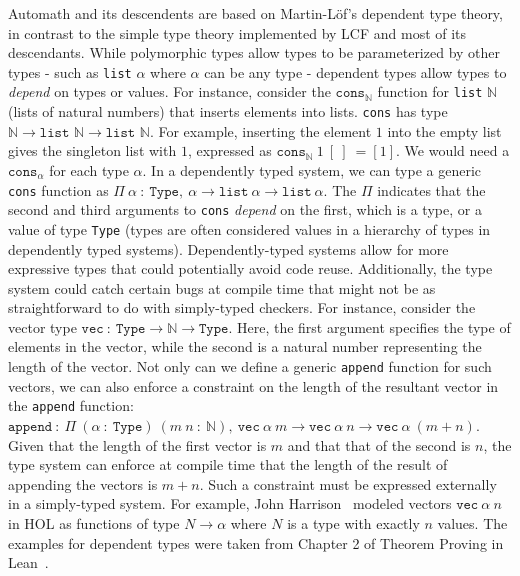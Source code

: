 \documentclass{article}
\begin{document}
  	Automath and its descendents are 
  	based on Martin-L\"{o}f's dependent 
  	type theory, in contrast to the
  	simple type theory implemented by  
  	LCF and most of	its descendants. 
  	While polymorphic 
  	types allow types to be 
  	parameterized by other types 
  	 - such as \texttt{list}
  	$ \alpha$ where $\alpha$ can be 
  	any type - dependent types allow 
  	types to \textit{depend} on 
  	types or values. For instance, 
  	consider the 
  	$\texttt{cons}_{\mathbb{N}}$
  	function for \texttt{list} 
  	$\mathbb{N}$ (lists of natural 
  	numbers) that inserts elements into 
  	lists. \texttt{cons} has type 
  	$\mathbb{N}	\to \texttt{list } 
  	\mathbb{N} \to \texttt{list } 
  	\mathbb{N}$. For example, 
  	inserting the element $1$ into 
  	the empty list gives the 
  	singleton list with $1$, expressed
  	as $\texttt{cons}_{\mathbb{N}}\ 
  	1\ [\ ]\ = [1]$. We would need 
  	a $\texttt{cons}_{\alpha}$ for 
  	each type $\alpha$. In a 
  	dependently typed system, we can 
  	type a generic \texttt{cons} 
  	function as $\Pi\ \alpha\ :\ 
  	\texttt{Type},\ \alpha \to 
  	\texttt{list}\ \alpha \to 
  	\texttt{list}\ \alpha$. The 
  	$\Pi$ indicates that the 
  	second and third arguments 
  	to \texttt{cons} \textit{depend}
  	on the first, which is a type, 
  	or a value of type \texttt{Type} 
  	(types are often considered 
  	values in a hierarchy
  	of types in dependently typed 
  	systems). Dependently-typed 
  	systems allow for more expressive
  	types that could potentially 
  	avoid code reuse. Additionally, 
  	the type system could catch 
  	certain bugs at compile time
  	that might not be as 
  	straightforward to do with 
  	simply-typed checkers. For 
  	instance, consider the 
  	vector type $\texttt{vec}\ 
  	:\ \texttt{Type} \to \mathbb{N}
  	\to \texttt{Type}$. Here, the 
  	first argument specifies the 
  	type of elements in the vector, 
  	while the second is a natural 
  	number representing the 
  	length of the vector. Not 
  	only can we define a generic
  	\texttt{append} function for 
  	such vectors, we can also 
  	enforce a constraint on the 
  	length of the resultant vector
  	in the \texttt{append} function:
  	$\texttt{append}\ :\ \Pi\ 
  	(\alpha\ :\ \texttt{Type})\ 
  	(m\ n\ :\ \mathbb{N}),\ 
  	\texttt{vec}\ \alpha\ m \to 
  	\texttt{vec}\ \alpha\ n \to 
  	\texttt{vec}\ \alpha\ (m + n)$.
  	Given that the length of the 
  	first vector is $m$ and that 
  	that of the	second is $n$, the 
  	type system	can enforce at compile 
  	time that the length of the result 
  	of appending the vectors is 
  	$m + n$. Such a constraint 
  	must be expressed externally 
  	in a simply-typed system. For 
  	example, John 
  	Harrison~\cite{10.1007/11541868_8} 
  	modeled vectors $\texttt{vec}\ 
  	\alpha\ n$ in HOL as functions 
  	of type	$N \to \alpha$ where $N$ 
  	is a type with exactly $n$ values. 
  	The examples for dependent 
  	types were taken from 
  	Chapter 2 of Theorem Proving 
  	in Lean~\cite{avigad2016theorem}.
  
\end{document}
